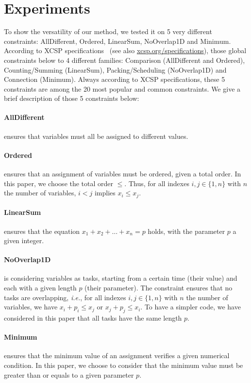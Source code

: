 \documentclass{article}
\newcommand{\ie}{\textit{i.e.}}
\begin{document}
\section{Experiments}\label{sec:xp}

To  show  the versatility  of  our  method, we  tested  it  on 5  very
different constraints:  AllDifferent, Ordered,  LinearSum, NoOverlap1D
and Minimum.   According to XCSP specifications~\cite{xcsp}  (see also
\href{http://xcsp.org/specifications}{xcsp.org/specifications}), those
global  constraints   below  to   4  different   families:  Comparison
(AllDifferent    and     Ordered),    Counting/Summing    (LinearSum),
Packing/Scheduling  (NoOverlap1D)  and Connection  (Minimum).   Always
according to XCSP specifications, these 5 constraints are among the 20
most popular and  common constraints.  We give a  brief description of
those 5 constraints below:

\paragraph{AllDifferent} ensures  that variables must all  be assigned
to different values.
\paragraph{Ordered} ensures  that an  assignment of variables  must be
ordered, given a total order. In this paper, we choose the total order
$\leq$. Thus, for all indexes $i,j \in \{1,n\}$ with $n$ the number of
variables, $i < j$ implies $x_i \leq x_j$.
\paragraph{LinearSum}       ensures       that      the       equation
$x_1 + x_2 +  \ldots + x_n = p$ holds, with the  parameter $p$ a given
integer.
\paragraph{NoOverlap1D}  is considering  variables as  tasks, starting
from a  certain time (their  value) and each  with a given  length $p$
(their  parameter).    The  constraint  ensures  that   no  tasks  are
overlapping,  \ie, for  all indexes  $i,j  \in \{1,n\}$  with $n$  the
number   of   variables,  we   have   $x_i   +   p_i  \leq   x_j$   or
$x_j + p_j \leq  x_i$.  To have a simpler code,  we have considered in
this paper that all tasks have the same length $p$.
\paragraph{Minimum} ensures  that the  minimum value of  an assignment
verifies  a given  numerical condition.  In this  paper, we  choose to
consider that  the minimum value must  be greater than or  equals to a
given parameter $p$.
\end{document}
